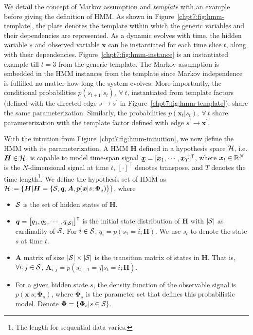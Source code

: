 We detail the concept of Markov assumption and \textit{template} with an example before giving the definition of HMM. As shown in Figure~\ref{chpt7:fig:hmm-template}, the plate denotes the template within which the generic variables and their dependencies are represented. As a dynamic evolves with time, the hidden variable $s$ and observed variable $\bm{x}$ can be instantiated for each time slice $t$, along with their dependencies. Figure~\ref{chpt7:fig:hmm-instance} is an instantiated example till $t=3$ from the generic template. The Markov assumption is embedded in the HMM instances from the template since Markov independence is fulfilled no matter how long the system evolves. More importantly, the conditional probabilities $p(s_{t+1}|s_{t}),~\forall~t$, instantiated from template factors (defined with the directed edge $s\rightarrow s^{\prime}$ in Figure~\ref{chpt7:fig:hmm-template}), share the same parameterization. Similarly, the probabilities $p(\bm{x}_{t}|s_{t}),~\forall~t$ share parameterization with the template factor defined with edge $s^{\prime}\rightarrow \bm{x}^{\prime}$.

With the intuition from Figure~\ref{chpt7:fig:hmm-inituition}, we now define the HMM with its parameterization. A HMM $\bm{H}$ defined in a hypothesis space $\mathcal{H}$, i.e. $\bm{H} \in \mathcal{H}$, is capable to model time-span signal $\ubar{\bm{x}} = \left[ \bm{x}_1, \cdots, \bm{x}_T\right]^{\intercal}$, where $\bm{x}_t\in \mathbb{R}^{N}$ is the $N$-dimensional signal at time $t$, $[\cdot]^{\intercal}$ denotes transpose, and $T$ denotes the time length\footnote{The length for  sequential data varies.}. We define the hypothesis set of HMM as $\mathcal{H} := \{\bm{H} | \bm{H}=\{\mathcal{S}, \bm{q}, \bm{A}, p(\bm{x}|{s}; \bm{\Phi}_{s})\}\}$, where
\begin{itemize}
\item $\mathcal{S}$ is the set of hidden states of $\bm{H}$.
\item $\bm{q} = \left[ q_1, q_2, \cdots, q_{|\mathcal{S}|}\right]^\intercal$ is the initial state distribution of $\bm{H}$ with $|\mathcal{S}|$ as cardinality of $\mathcal{S}$. For $i \in \mathcal{S}$, $q_i = p(s_{1}=i;\bm{H})$. We use $s_t$ to denote the state $s$ at time $t$.
\item $\bm{A}$ matrix of size $|\mathcal{S}| \times |\mathcal{S}|$ is the transition matrix of states in $\bm{H}$. That is, $\forall i, j \in \mathcal{S}$,  $\bm{A}_{i,j} = p(s_{t+1}=j|s_{t}=i; \bm{H})$.
\item For a given hidden state $s$, the density function of the observable signal is $p({\bm{x}}|{s};\bm{\Phi}_{s})$, where $\bm{\Phi}_{s}$ is the parameter set that defines this probabilistic model. Denote $\bm{\Phi} = \left\{ \bm{\Phi}_{s}| s \in \mathcal{S} \right\}$.
\end{itemize}


